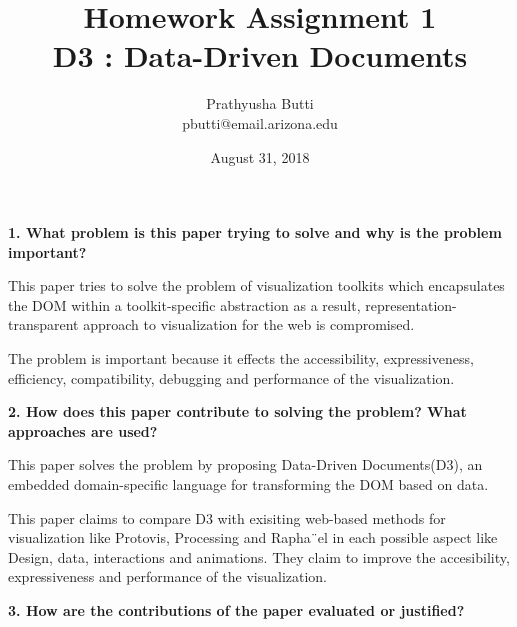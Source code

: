 \documentclass{article}[12pt]
\begin{document}
\title{Homework Assignment 1 \\
	\large D3 : Data-Driven Documents \\}
\date{August 31, 2018}

\author{
   Prathyusha Butti \\
   pbutti@email.arizona.edu
}

\maketitle

\noindent
{\bf 1. What problem is this paper trying to solve and why is the problem
   important?}

{
	This paper tries to solve the problem of visualization toolkits which encapsulates the DOM within a toolkit-specific abstraction as a result, representation-transparent approach to visualization for the web is compromised.

	The problem is important because it effects the accessibility, expressiveness, efficiency, compatibility, debugging and performance of the visualization.
}




\vspace{2ex}\noindent
{\bf 2. How does this paper contribute to solving the problem? What approaches are
   used? }

{
	This paper solves the problem by proposing Data-Driven Documents(D3), an embedded domain-specific language for transforming the DOM based on data.

	This paper claims to compare D3 with exisiting web-based methods for visualization like Protovis, Processing and Rapha¨el in each possible aspect like Design, data, interactions and animations. They claim to improve the accesibility, expressiveness and performance of the visualization.
}




\vspace{2ex}\noindent
{\bf 3. How are the contributions of the paper evaluated or justified? }
\end{document}
